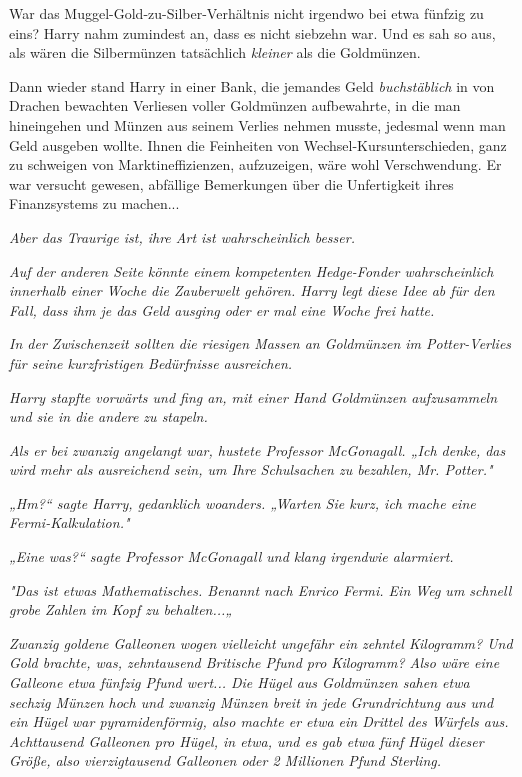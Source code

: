 {War das Muggel-Gold-zu-Silber-Verhältnis nicht irgendwo bei etwa fünfzig zu eins? Harry nahm zumindest an, dass es nicht siebzehn war. Und es sah so aus, als wären die Silbermünzen tatsächlich \emph{kleiner} als die Goldmünzen.

Dann wieder stand Harry in einer Bank, die jemandes Geld \emph{buchstäblich} in von Drachen bewachten Verliesen voller Goldmünzen aufbewahrte, in die man hineingehen und Münzen aus seinem Verlies nehmen musste, jedesmal wenn man Geld ausgeben wollte. Ihnen die Feinheiten von Wechsel-Kursunterschieden, ganz zu schweigen von Marktineffizienzen, aufzuzeigen, wäre wohl Verschwendung. Er war versucht gewesen, abfällige Bemerkungen über die Unfertigkeit ihres Finanzsystems zu machen...

\emph{Aber das Traurige ist, ihre Art ist wahrscheinlich besser.}

\emph{Auf der anderen Seite könnte einem kompetenten Hedge-Fonder wahrscheinlich innerhalb einer Woche die Zauberwelt gehören. Harry legt diese Idee ab für den Fall, dass ihm je das Geld ausging oder er mal eine Woche frei hatte.}

\emph{In der Zwischenzeit sollten die riesigen Massen an Goldmünzen im Potter-Verlies für seine kurzfristigen Bedürfnisse ausreichen.}

\emph{Harry stapfte vorwärts und fing an, mit einer Hand Goldmünzen aufzusammeln und sie in die andere zu stapeln.}

\emph{Als er bei zwanzig angelangt war, hustete Professor McGonagall. „Ich denke, das wird mehr als ausreichend sein, um Ihre Schulsachen zu bezahlen, Mr. Potter."}

\emph{„Hm?“ sagte Harry, gedanklich woanders. „Warten Sie kurz, ich mache eine Fermi-Kalkulation."}

\emph{„Eine} \emph{\emph{was?}“ sagte Professor McGonagall und klang irgendwie alarmiert.}

\emph{"Das ist etwas Mathematisches. Benannt nach Enrico Fermi. Ein Weg um schnell grobe Zahlen im Kopf zu behalten...„}

\emph{Zwanzig goldene Galleonen wogen vielleicht ungefähr ein zehntel Kilogramm? Und Gold brachte, was, zehntausend Britische Pfund pro Kilogramm? Also wäre eine Galleone etwa fünfzig Pfund wert... Die Hügel aus Goldmünzen sahen etwa sechzig Münzen hoch und zwanzig Münzen breit in jede Grundrichtung aus und ein Hügel war pyramidenförmig, also machte er etwa ein Drittel des Würfels aus. Achttausend Galleonen pro Hügel, in etwa, und es gab etwa fünf Hügel dieser Größe, also vierzigtausend Galleonen oder 2 Millionen Pfund Sterling.}

}
